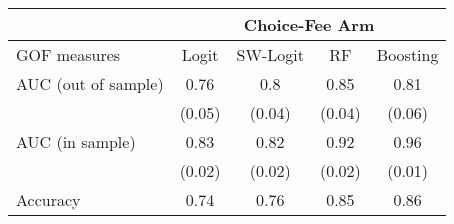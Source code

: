 \begin{tabular}{lcccc}
\toprule
      & \multicolumn{4}{c}{Choice-Fee Arm} \\
\midrule
\midrule
GOF measures & Logit & SW-Logit & RF    & Boosting \\
\midrule
\midrule
AUC (out of sample) & 0.76  & 0.8   & 0.85  & 0.81 \\
      & (0.05) & (0.04) & (0.04) & (0.06) \\
AUC (in sample) & 0.83  & 0.82  & 0.92  & 0.96 \\
      & (0.02) & (0.02) & (0.02) & (0.01) \\
Accuracy & 0.74  & 0.76  & 0.85  & 0.86 \\
\bottomrule
\bottomrule
\end{tabular}%
